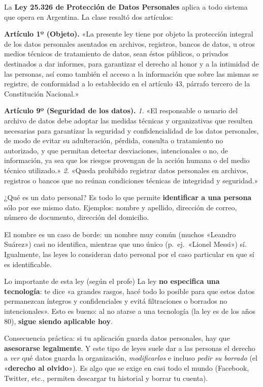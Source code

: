 \documentclass[11pt,a4paper]{article}
\begin{document}
La \textbf{Ley 25.326 de Protección de Datos Personales} aplica a todo sistema que opera en
Argentina. La clase resaltó dos artículos:

\begin{slidebox}
\textbf{Artículo 1º (Objeto).} «La presente ley tiene por objeto la protección integral de
los datos personales asentados en archivos, registros, bancos de datos, u otros medios
técnicos de tratamiento de datos, sean éstos públicos, o privados destinados a dar informes,
para garantizar el derecho al honor y a la intimidad de las personas, así como también el
acceso a la información que sobre las mismas se registre, de conformidad a lo establecido en
el artículo 43, párrafo tercero de la Constitución Nacional.»

\smallskip
\textbf{Artículo 9º (Seguridad de los datos).}
\emph{1.} «El responsable o usuario del archivo de datos debe adoptar las medidas técnicas y
organizativas que resulten necesarias para garantizar la seguridad y confidencialidad de los
datos personales, de modo de evitar su adulteración, pérdida, consulta o tratamiento no
autorizado, y que permitan detectar desviaciones, intencionales o no, de información, ya sea
que los riesgos provengan de la acción humana o del medio técnico utilizado.»
\emph{2.} «Queda prohibido registrar datos personales en archivos, registros o bancos que no
reúnan condiciones técnicas de integridad y seguridad.»
\end{slidebox}

\begin{defbox}{¿Qué es un dato personal?}
Es todo lo que permite \textbf{identificar a una persona} sólo por ese mismo dato. Ejemplos:
nombre y apellido, dirección de correo, número de documento, dirección del domicilio.

\smallskip
El nombre es un caso de borde: un nombre muy común (muchos «Leandro Suárez») casi no
identifica, mientras que uno único (p.\ ej.\ «Lionel Messi») sí. Igualmente, las leyes lo
consideran dato personal por el caso particular en que sí es identificable.
\end{defbox}

\begin{notebox}{Lo importante de esta ley (según el profe)}
La ley \textbf{no especifica una tecnología}: te dice «a grandes rasgos, hacé todo lo posible
para que estos datos permanezcan íntegros y confidenciales y evitá filtraciones o borrados no
intencionales». Esto es bueno: al no atarse a una tecnología (la ley es de los años 80),
\textbf{sigue siendo aplicable hoy}.

\smallskip
Consecuencia práctica: si tu aplicación guarda datos personales, hay que \textbf{asesorarse
legalmente}. Y este tipo de leyes suele dar a las personas el derecho a \emph{ver} qué datos
guarda la organización, \emph{modificarlos} e incluso \emph{pedir su borrado} (el
«\textbf{derecho al olvido}»). Es algo que se exige en casi todo el mundo (Facebook, Twitter,
etc., permiten descargar tu historial y borrar tu cuenta).
\end{notebox}
\end{document}
